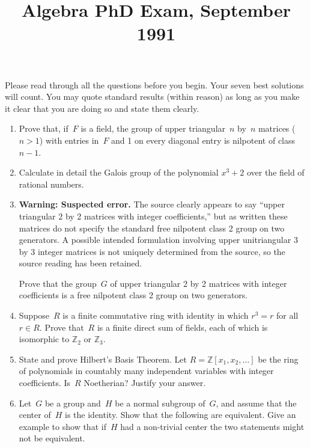 \documentclass[11pt,letterpaper]{article}
\title{Algebra PhD Exam, September 1991}
\author{}
\date{}
\newenvironment{problemconcern}{%
  \par\tagstructbegin{tag=Aside}\begingroup\color{ProblemConcern}
}{%
  \par\endgroup\tagstructend\nopagebreak[4]\vspace{0.12em}
}
\newenvironment{examproblems}[2]{%
  \def\ProblemHeadingTag{#2}%
  \AssignTaggingSocketPlug{block/list/label}{examproblem}%
  \begin{enumerate}%
  \setcounter{enumi}{#1}%
  \renewcommand{\labelenumi}{\textbf{\theenumi.}}%
  \setlength{\topsep}{0.35em}%
  \setlength{\partopsep}{0pt}%
  \setlength{\itemsep}{0.48em}%
  \setlength{\parsep}{0.18em}%
}{\end{enumerate}}
\newenvironment{examinstructions}{%
  \par\begingroup\itshape
}{%
  \par\endgroup\vspace{0.18em}
}
\begin{document}
\maketitle
\thispagestyle{empty}
\begin{examinstructions}
Please read through all the questions before you begin. Your seven best solutions will count. You may quote standard results (within reason) as long as you make it clear that you are doing so and state them clearly.
\end{examinstructions}
\begin{examproblems}{0}{H2}
\def\ProblemHeadingText{Problem 1.}
\item
Prove that, if~\(F\) is a field, the group of upper triangular~\(n\) by~\(n\) matrices (\(n>1\)) with entries in~\(F\) and 1 on every diagonal entry is nilpotent of class \(n-1\).
\def\ProblemHeadingText{Problem 2.}
\item
Calculate in detail the Galois group of the polynomial \(x^3+2\) over the field of rational numbers.
\def\ProblemHeadingText{Problem 3.}
\item
\begin{problemconcern}
\textbf{Warning: Suspected error.} The source clearly appears to say “upper triangular 2 by 2 matrices with integer coefficients,” but as written these matrices do not specify the standard free nilpotent class 2 group on two generators. A possible intended formulation involving upper unitriangular 3 by 3 integer matrices is not uniquely determined from the source, so the source reading has been retained.
\end{problemconcern}
Prove that the group~\(G\) of upper triangular 2 by 2 matrices with integer coefficients is a free nilpotent class 2 group on two generators.
\def\ProblemHeadingText{Problem 4.}
\item
Suppose~\(R\) is a finite commutative ring with identity in which \(r^3=r\) for all \(r\in R\). Prove that~\(R\) is a finite direct sum of fields, each of which is isomorphic to \(\mathbb Z_2\) or \(\mathbb Z_3\).
\def\ProblemHeadingText{Problem 5.}
\item
State and prove Hilbert’s Basis Theorem. Let \(R=\mathbb Z[x_1,x_2,\ldots]\) be the ring of polynomials in countably many independent variables with integer coefficients. Is~\(R\) Noetherian? Justify your answer.
\def\ProblemHeadingText{Problem 6.}
\item
Let~\(G\) be a group and~\(H\) be a normal subgroup of~\(G\), and assume that the center of~\(H\) is the identity. Show that the following are equivalent. Give an example to show that if~\(H\) had a non-trivial center the two statements might not be equivalent.

\end{examproblems}
\end{document}
